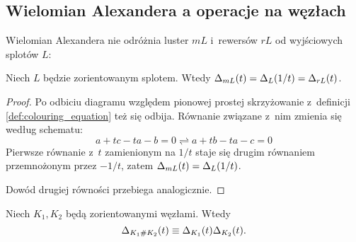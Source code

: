 
\subsection{Wielomian Alexandera a operacje na węzłach}
Wielomian Alexandera nie odróżnia luster $mL$ i~rewersów $rL$ od wyjściowych splotów $L$:

\begin{proposition}
%
%
    Niech $L$ będzie zorientowanym splotem.
    Wtedy $\Delta_{mL}(t) = \Delta_L(1/t) = \Delta_{rL}(t)$.
\end{proposition}

\begin{proof}
    Po odbiciu diagramu względem pionowej prostej skrzyżowanie z~definicji \ref{def:colouring_equation} też się odbija.
    Równanie związane z~nim zmienia się według schematu:
    \begin{equation}
        a + tc - ta - b = 0 \rightleftharpoons a + tb - ta - c = 0
    \end{equation}
    Pierwsze równanie z~$t$ zamienionym na $1/t$ staje się drugim równaniem przemnożonym przez $-1/t$, zatem $\Delta_{mL}(t) = \Delta_L(1/t)$.
    
    Dowód drugiej równości przebiega analogicznie.
\end{proof}

\begin{proposition}
\label{prp:alexander_multiplicative}%
    Niech $K_1, K_2$ będą zorientowanymi węzłami.
    Wtedy
    \begin{equation}
        \Delta_{K_1 \mathbin{\#} K_2}(t) \equiv \Delta_{K_1}(t) \Delta_{K_2}(t).
    \end{equation}
\end{proposition}

